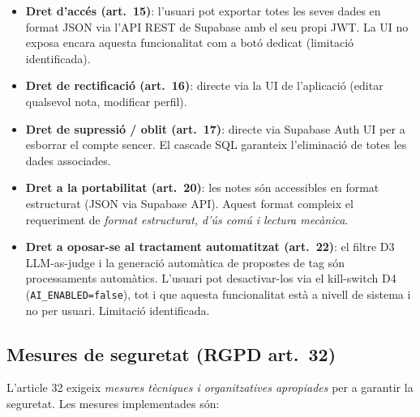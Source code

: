 \begin{itemize}
    \item \textbf{Dret d'accés (art.~15)}: l'usuari pot exportar totes les seves dades en format JSON via l'API REST de Supabase amb el seu propi JWT. La UI no exposa encara aquesta funcionalitat com a botó dedicat (limitació identificada).
    \item \textbf{Dret de rectificació (art.~16)}: directe via la UI de l'aplicació (editar qualsevol nota, modificar perfil).
    \item \textbf{Dret de supressió / oblit (art.~17)}: directe via Supabase Auth UI per a esborrar el compte sencer. El cascade SQL garanteix l'eliminació de totes les dades associades.
    \item \textbf{Dret a la portabilitat (art.~20)}: les notes són accessibles en format estructurat (JSON via Supabase API). Aquest format compleix el requeriment de \emph{format estructurat, d'ús comú i lectura mecànica}.
    \item \textbf{Dret a oposar-se al tractament automatitzat (art.~22)}: el filtre D3 LLM-as-judge i la generació automàtica de propostes de tag són processaments automàtics. L'usuari pot desactivar-los via el kill-switch D4 (\texttt{AI\_ENABLED=false}), tot i que aquesta funcionalitat està a nivell de sistema i no per usuari. Limitació identificada.
\end{itemize}

\subsection{Mesures de seguretat (RGPD art.~32)}

L'article 32 exigeix \emph{mesures tècniques i organitzatives apropiades} per a garantir la seguretat. Les mesures implementades són:


